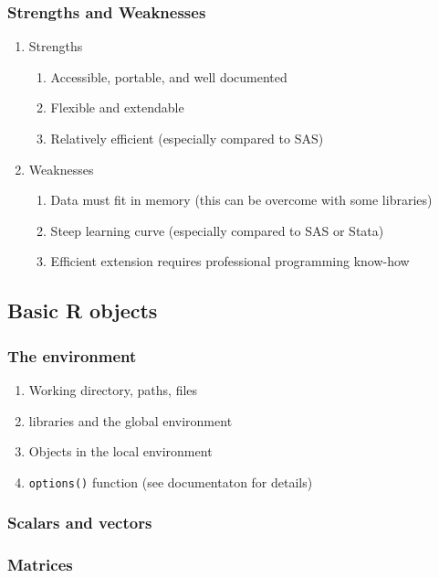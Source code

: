 \documentclass{beamer}
\begin{document}
\begin{frame}
    \frametitle{Strengths and Weaknesses}
    \begin{enumerate}
      \item Strengths
      \begin{enumerate}
        \item Accessible, portable, and well documented
        \item Flexible and extendable
        \item Relatively efficient (especially compared to SAS)
      \end{enumerate}
      \item Weaknesses
      \begin{enumerate}
        \item Data must fit in memory (this can be overcome with some libraries)
        \item Steep learning curve (especially compared to SAS or Stata)
        \item Efficient extension requires professional programming know-how
      \end{enumerate}
    \end{enumerate}
\end{frame}


\subsection{Basic R objects}

\begin{frame}[fragile]
    \frametitle{The environment}
    \begin{enumerate}
      \item Working directory, paths, files
      \item libraries and the global environment
      \item Objects in the local environment
      \item \texttt{options()} function (see documentaton for details)
    \end{enumerate}
    
\end{frame}


\begin{frame}[fragile]
    \frametitle{Scalars and vectors}
    
\end{frame}


\begin{frame}[fragile]
    \frametitle{Matrices}
    
\end{frame}
\end{document}
